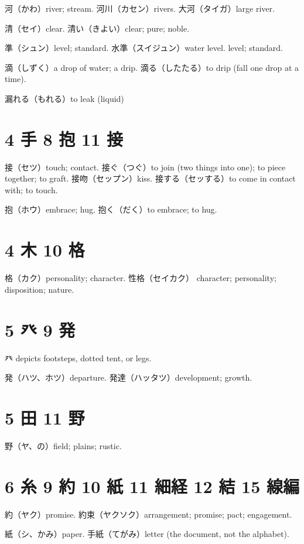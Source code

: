 河（かわ）river; stream.
河川（カセン）rivers.
大河（タイガ）large river.

清（セイ）clear.
清い（きよい）clear; pure; noble.

準（シュン）level; standard.
水準（スイジュン）water level. level; standard.

滴（しずく）a drop of water; a drip.
滴る（したたる）to drip (fall one drop at a time).

漏れる（もれる）to leak (liquid)

\section{4 手 8 抱 11 接}

接（セツ）touch; contact.
接ぐ（つぐ）to join (two things into one); to piece together; to graft.
接吻（セップン）kiss.
接する（セッする）to come in contact with; to touch.

抱（ホウ）embrace; hug.
抱く（だく）to embrace; to hug.

\section{4 木 10 格}

格（カク）personality; character.
性格（セイカク）
character; personality; disposition; nature.

\section{5 癶 9 発}

癶 depicts footsteps, dotted tent, or legs.

発（ハツ、ホツ）departure.
発達（ハッタツ）development; growth.

\section{5 田 11 野}

野（ヤ、の）field; plains; rustic.

\section{6 糸 9 約 10 紙 11 細経 12 結 15 線編}

約（ヤク）promise.
約束（ヤクソク）arrangement; promise; pact; engagement.

紙（シ、かみ）paper.
手紙（てがみ）letter (the document, not the alphabet).

